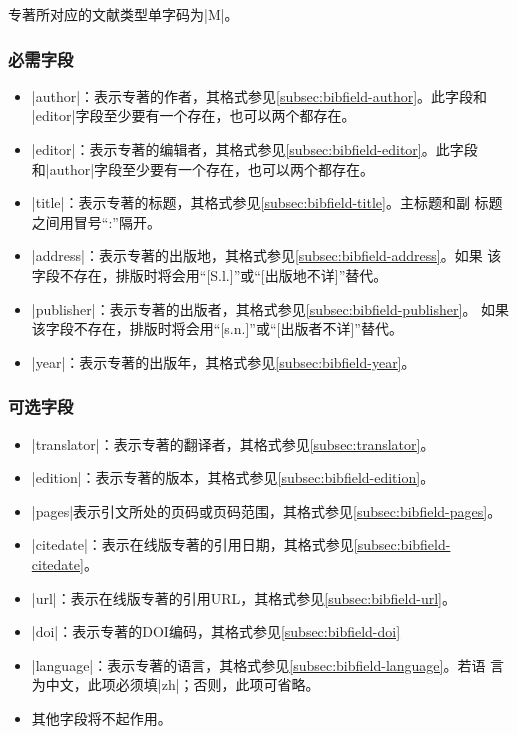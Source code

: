 专著所对应的文献类型\cite{gbt3469-1983}单字码为|M|。

\subsubsection{必需字段}

\begin{itemize}
\item |author|：表示专著的作者，其格式参见\ref{subsec:bibfield-author}。此字段和
  |editor|字段至少要有一个存在，也可以两个都存在。
\item |editor|：表示专著的编辑者，其格式参见\ref{subsec:bibfield-editor}。此字段
  和|author|字段至少要有一个存在，也可以两个都存在。
\item |title|：表示专著的标题，其格式参见\ref{subsec:bibfield-title}。主标题和副
  标题之间用冒号``:''隔开。
\item |address|：表示专著的出版地，其格式参见\ref{subsec:bibfield-address}。如果
  该字段不存在，{\BibTeX}排版时将会用``[S.l.]''或``[出版地不详]''替代。
\item |publisher|：表示专著的出版者，其格式参见\ref{subsec:bibfield-publisher}。
  如果该字段不存在，{\BibTeX}排版时将会用``[s.n.]''或``[出版者不详]''替代。
\item |year|：表示专著的出版年，其格式参见\ref{subsec:bibfield-year}。
\end{itemize}

\subsubsection{可选字段}

\begin{itemize}
\item |translator|：表示专著的翻译者，其格式参见\ref{subsec:translator}。
\item |edition|：表示专著的版本，其格式参见\ref{subsec:bibfield-edition}。
\item |pages|表示引文所处的页码或页码范围，其格式参见\ref{subsec:bibfield-pages}。
\item |citedate|：表示在线版专著的引用日期，其格式参见\ref{subsec:bibfield-citedate}。
\item |url|：表示在线版专著的引用URL，其格式参见\ref{subsec:bibfield-url}。
\item |doi|：表示专著的DOI编码，其格式参见\ref{subsec:bibfield-doi}
\item |language|：表示专著的语言，其格式参见\ref{subsec:bibfield-language}。若语
  言为中文，此项必须填|zh|；否则，此项可省略。
\item 其他字段将不起作用。
\end{itemize}

